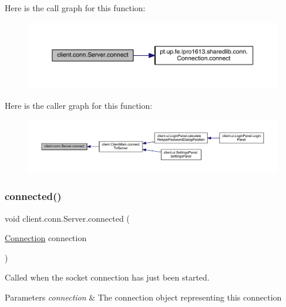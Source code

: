 Here is the call graph for this function\+:
\nopagebreak
\begin{figure}[H]
\begin{center}
\leavevmode
\includegraphics[width=350pt]{classclient_1_1conn_1_1_server_a7e96a6bd486520d128a37a8216cf37c3_cgraph}
\end{center}
\end{figure}
Here is the caller graph for this function\+:
\nopagebreak
\begin{figure}[H]
\begin{center}
\leavevmode
\includegraphics[width=350pt]{classclient_1_1conn_1_1_server_a7e96a6bd486520d128a37a8216cf37c3_icgraph}
\end{center}
\end{figure}
\hypertarget{classclient_1_1conn_1_1_server_ac8ad09c9052bfb32e082493ada8d14ab}{}\label{classclient_1_1conn_1_1_server_ac8ad09c9052bfb32e082493ada8d14ab} 
\subsubsection{\texorpdfstring{connected()}{connected()}}
{\footnotesize\ttfamily void client.\+conn.\+Server.\+connected (\begin{DoxyParamCaption}\item[{\hyperlink{classpt_1_1up_1_1fe_1_1lpro1613_1_1sharedlib_1_1conn_1_1_connection}{Connection}}]{connection }\end{DoxyParamCaption})}

Called when the socket connection has just been started.


\begin{DoxyParams}{Parameters}
{\em connection} & The connection object representing this connection \\
\hline
\end{DoxyParams}


